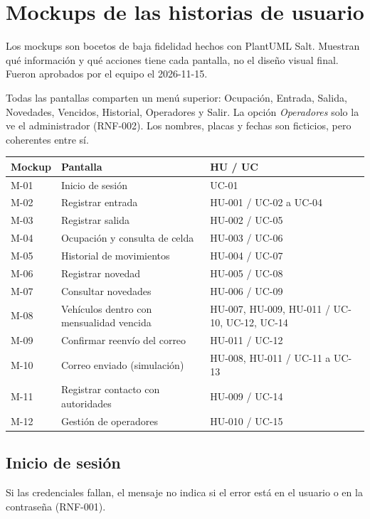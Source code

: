 \chapter{Mockups de las historias de usuario}\label{cap:mockups}

Los mockups son bocetos de baja fidelidad hechos con PlantUML Salt. Muestran qué información y qué acciones tiene cada pantalla, no el diseño visual final. Fueron aprobados por el equipo el 2026-11-15.

Todas las pantallas comparten un menú superior: Ocupación, Entrada, Salida, Novedades, Vencidos, Historial, Operadores y Salir. La opción \emph{Operadores} solo la ve el administrador (RNF-002). Los nombres, placas y fechas son ficticios, pero coherentes entre sí.

\begin{longtable}{>{\raggedright\arraybackslash}p{1.6cm}>{\raggedright\arraybackslash}p{6.4cm}>{\raggedright\arraybackslash}p{6.4cm}}
\toprule
\textbf{Mockup} & \textbf{Pantalla} & \textbf{HU / UC}\\
\midrule\endhead
M-01 & Inicio de sesión & UC-01\\
M-02 & Registrar entrada & HU-001 / UC-02 a UC-04\\
M-03 & Registrar salida & HU-002 / UC-05\\
M-04 & Ocupación y consulta de celda & HU-003 / UC-06\\
M-05 & Historial de movimientos & HU-004 / UC-07\\
M-06 & Registrar novedad & HU-005 / UC-08\\
M-07 & Consultar novedades & HU-006 / UC-09\\
M-08 & Vehículos dentro con mensualidad vencida & HU-007, HU-009, HU-011 / UC-10, UC-12, UC-14\\
M-09 & Confirmar reenvío del correo & HU-011 / UC-12\\
M-10 & Correo enviado (simulación) & HU-008, HU-011 / UC-11 a UC-13\\
M-11 & Registrar contacto con autoridades & HU-009 / UC-14\\
M-12 & Gestión de operadores & HU-010 / UC-15\\
\bottomrule
\end{longtable}

\section{Inicio de sesión}
Si las credenciales fallan, el mensaje no indica si el error está en el usuario o en la contraseña (RNF-001).


